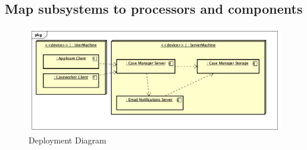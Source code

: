 \subsection{Map subsystems to processors and components}
\begin{figure}[htb!]
    \centering
    \includegraphics[width=\textwidth]{img/pkg-deployment-diagram.png}
    \caption{Deployment Diagram}
\end{figure}


